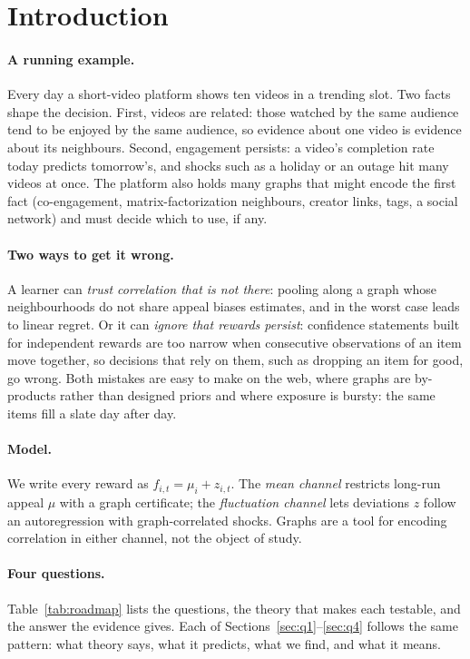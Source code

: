 \documentclass[11pt]{article}
\theoremstyle{definition}
\theoremstyle{remark}
\begin{document}
\section{Introduction}

\paragraph{A running example.} Every day a short-video platform shows ten videos in a trending slot. Two facts shape the decision. First, videos are related: those watched by the same audience tend to be enjoyed by the same audience, so evidence about one video is evidence about its neighbours. Second, engagement persists: a video's completion rate today predicts tomorrow's, and shocks such as a holiday or an outage hit many videos at once. The platform also holds many graphs that might encode the first fact (co-engagement, matrix-factorization neighbours, creator links, tags, a social network) and must decide which to use, if any.

\paragraph{Two ways to get it wrong.} A learner can \emph{trust correlation that is not there}: pooling along a graph whose neighbourhoods do not share appeal biases estimates, and in the worst case leads to linear regret. Or it can \emph{ignore that rewards persist}: confidence statements built for independent rewards are too narrow when consecutive observations of an item move together, so decisions that rely on them, such as dropping an item for good, go wrong. Both mistakes are easy to make on the web, where graphs are by-products rather than designed priors and where exposure is bursty: the same items fill a slate day after day.

\paragraph{Model.} We write every reward as $f_{i,t}=\mu_i+z_{i,t}$. The \emph{mean channel} restricts long-run appeal $\mu$ with a graph certificate; the \emph{fluctuation channel} lets deviations $z$ follow an autoregression with graph-correlated shocks. Graphs are a tool for encoding correlation in either channel, not the object of study.

\paragraph{Four questions.} Table~\ref{tab:roadmap} lists the questions, the theory that makes each testable, and the answer the evidence gives. Each of Sections~\ref{sec:q1}--\ref{sec:q4} follows the same pattern: what theory says, what it predicts, what we find, and what it means.
\end{document}
